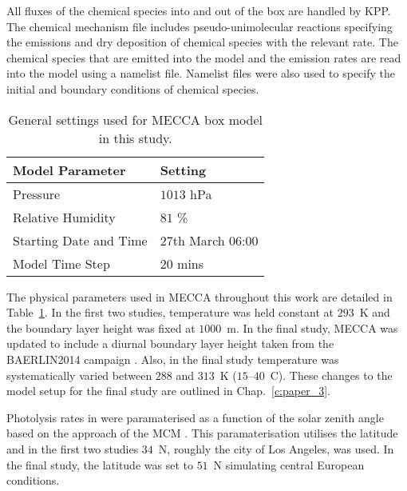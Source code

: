 All fluxes of the chemical species into and out of the box are handled by KPP.
The chemical mechanism file includes pseudo-unimolecular reactions specifying the emissions and dry deposition of chemical species with the relevant rate.
The chemical species that are emitted into the model and the emission rates are read into the model using a namelist file.  
Namelist files were also used to specify the initial and boundary conditions of chemical species.

\begin{table}[t]%
    \begin{center}%
        \caption{General settings used for MECCA box model in this study.}%
        \begin{tabular}{ll}%
            \hline \hline
            \textbf{Model Parameter} & \textbf{Setting} \\
            \hline \hline
            Pressure & $1013$ hPa \\
            Relative Humidity & $81$ \% \\
            Starting Date and Time & 27th March 06:00 \\
            Model Time Step & $20$ mins \\
            \hline \hline
        \end{tabular}%
        \label{t:model_setup}%
    \end{center}%
\end{table}%
The physical parameters used in MECCA throughout this work are detailed in Table~\ref{t:model_setup}.
In the first two studies, temperature was held constant at $293$~K and the boundary layer height was fixed at $1000$~m.
In the final study, MECCA was updated to include a diurnal boundary layer height taken from the BAERLIN2014 campaign \citep{Bonn:2016}.
Also, in the final study temperature was systematically varied between $288$ and $313$~K ($15$--$40$~\degree C).
These changes to the model setup for the final study are outlined in Chap.~\ref{c:paper_3}.

Photolysis rates in were paramaterised as a function of the solar zenith angle based on the approach of the MCM \citep{Jenkin:1997}.
This paramaterisation utilises the latitude and in the first two studies $34$~\degree N, roughly the city of Los Angeles, was used.
In the final study, the latitude was set to $51$~\degree N simulating central European conditions.

